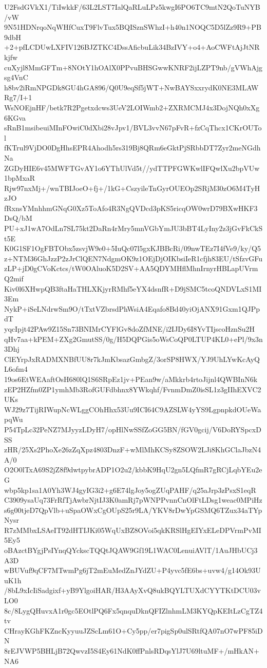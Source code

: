 U2FsdGVkX1/TiIwkkF/63L2LST7IalQaRLuLPz5kwgI6PO6TC9mtN2QoTuNYB/vW
9N51HDNrqoNqWHfCuxT9FlvTux5BQISznSWhzI+h40n1NOQC5D5lZz9R9+PB9dbH
+2+pfLCDUwLXFIV126BJZTKC4DssAficbuLik34BzIVY+o4+AoCWFtAjJtNRkjfw
cuXyjl8MmGFTm+8NOtY1hOAlX0PPvuBHSGwwKNRF2ijLZPT9nb/gVWhAjgsg4VnC
h8bv2iRmNPGDk8GU4hGA896/Q0U9eqSf5jWT+NwBAYSxxrydK0NE3MLAWRg7/I+1
WsNOEjnHF/betk7R2Pgetxdcws3UeV2LOIWmb2+ZXRMCMJ4x3DojNQh0xXg6KGva
sRnB1msibeuiMInFOwiC0dXbi28vJpv1/BVL3vvN67pFvR+fzCqThcx1CKrOUTol
fKTrul9VjDO0DgHhsEPR4Ahodh5rs319Bj8QRm6eGktPjSRbbDT7Zyr2meNGdhNa
ZGDyHIE6v45MWFTGvAY1o6YThUlVd5t//ydTTPFGWKwlIFQwlXu2bpVUw1bpMxaR
Rjw97nxMj+/wnTBIJoeO+fj+/1kG+CszyileTnGyrOUEOp2SRjM30zO6M4TyHzJO
fRxnsYMnhhmGNqG0Xz5ToAfo4R3NgQVDcd3pKS5ricqOW0wrD79BXwHKF3DsQ/bM
PU+xJ1wA7OdLn7SL75kt2DaRn4rMry5mnVGbYmJU3bBT4LyIny2z3jGvFkCkSt5E
K0G1SF1OgFBTObx5zsvjW9e0+5IuQc07l5gxKJBBcRi/09nwTEz7I4fVe9/ky/Q5
z+NTM36GhJzzP2zJrClQEN7NdgmOK9z1OEjDjOIKbsiIeR1cfjh83EU/tSfzvGFu
zLP+jD0gCVoKctcs/tW0OAluoK5D2SV+AA5QDYMHflMhnIrnyrHBLapUVrmQ2mif
Kiv0l6XHwpQB3ftaHaTHLXKjyrRMhf5eYX4dsnfR+D9jSMC5tcoQNDVLxS1MI3Em
NykP+iSeLNdrwSm9O/tTxtVZbrsdPhWsiA4Eqafo8Bd40yiOjANX91Gxm1QJPpdT
yqcIpjt42PAw9Z15Sn73BNIMrCYFlGv8doZfMNE/i2IJDy6I8YvTIjscoHznSu2H
qHv7aa+kPEM+ZXg2GmutSS/0g/H5DQPGis5oWsCoQP0LTUP4KL0+ePl/9x3n3Dhj
ClEYrpJxRADMXNBfUU8r7kJmKbsazGmbgZ/3orSP8HWX/YJ9UhLYwKcAyQL6ofm4
19os6EtWEAaftOsH680lQ1S6SRpEz1jv+PEan9w/aMkkrb4rtoJijnl4QWBInN6k
zEP2HZfm0ZP1ymhMb3RofGUFdbhnx8YWkqhf/FvnmDmZ0isSL1z3gIIhEXVC2UKs
WJ29z7TijRIWupNcWLggCOhHhx53Uu9ICI64C9AZSLW4yYS9LgpnpkdOUeWapqWu
P54TpLc32PeNZ7MJyyzLDyH7/opHlNwSSfZoGG5BN/fGV0gcij/V6DoRYSpcxDSS
zHR/25Xs2PhoXe26zZqXpz4803DnzF+wMlMhKCSy8ZSOW2LJi8KhGClaJbzN4A/0
O2O0lTxA69S2jZ8f9dwtpybrADP1O2u2/kbbK9HqU2gn5LQfmR7gRCjLqbYEu2eG
wbp5kp1sa1A0Yh3WJ4gyIG3i2+g6E74lgJoy5ogZUqPAHF/q25aJrp3zPsxS1eqR
C3909ysaUq73FrRfTjAwbrNjtIJ3K0amRj7pWNPPvnnCnOlFtLDsg1weac0MPiHz
s6g00tjeD7QpVlb+uSpaOWxCgOUpS25r9LA/YKV8rDwYpGSMQ6TZux34aTYpNysr
R7zMMbxLSAeIT92dHTIJKi05WqUxBZ8OVoi5qkKRSlHgEIYxELeDPVrmPvMI5Ey5
oBAzctBYgjPsIYnqQYckscTQQtJQAW9Gf19L1WAC0LenuiAVlT/1AuJHbUCj3A3D
wBUVuf9qCF7MTwmPg6jT2mEuMedZnJYdZU+P4yvc5fE6bs+uvw4/g14Ok93UuK1h
/8bL9xIcIiSadgixf+yB9YlgoiHAR/H3AAyXvQ8ukBQYLTUXdCYYTKtDCU03vLO0
8c/8LygQHuvxA1r0gc5EOtlPQ6Fx5qnquDknQFIZlnhmLM3KYQpKEItLzCgTZ4tv
CHrayKGhFKZncKyyuuJZScLm61O+Cy5pp/er7pigSp0ulSRtfQA07nO7wPF85iDN
8rEJVWP5BHLjB72QwvzI5S4Ey61NdK0ffPnlsRDqsYlJ7U69ltuMF+/mHkAN+NA6
